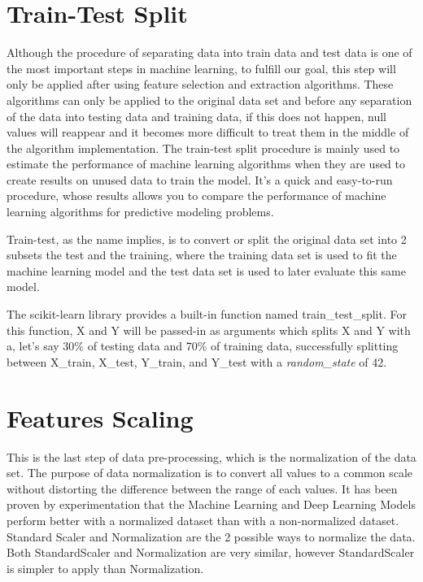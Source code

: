 \section{Train-Test Split} %
\label{sec:test_train_split}
\hspace{10px}Although the procedure of separating data into train data and test data is one of the most important steps in machine learning, to fulfill our goal, this step will only be applied after using feature selection and extraction algorithms. These algorithms can only be applied to the original data set and before any separation of the data into testing data and training data, if this does not happen, null values will reappear and it becomes more difficult to treat them in the middle of the algorithm implementation. The train-test split procedure is mainly used to estimate the performance of machine learning algorithms when they are used to create results on unused data to train the model. It's a quick and easy-to-run procedure, whose results allows you to compare the performance of machine learning algorithms for predictive modeling problems.

Train-test, as the name implies, is to convert or split the original data set into 2 subsets the test and the training, where the training data set is used to fit the machine learning model and the test data set is used to later evaluate this same model.

The scikit-learn library provides a built-in function named train\_test\_split. For this function, X and Y will be passed-in as arguments which splits X and Y with a, let's say 30\% of testing data and 70\% of training data, successfully splitting between X\_train, X\_test, Y\_train, and Y\_test with a \textit{random\_state} of 42.


\section{Features Scaling} %
\label{sec:feature_scaling}
\hspace{10px} This is the last step of data pre-processing, which is the normalization of the data set. The purpose of data normalization is to convert all values to a common scale without distorting the difference between the range of each values. It has been proven by experimentation that the Machine Learning and Deep Learning Models perform better with a normalized dataset than with a non-normalized dataset. Standard Scaler and Normalization are the 2 possible ways to normalize the data. Both StandardScaler and Normalization are very similar, however StandardScaler is simpler to apply than Normalization.

